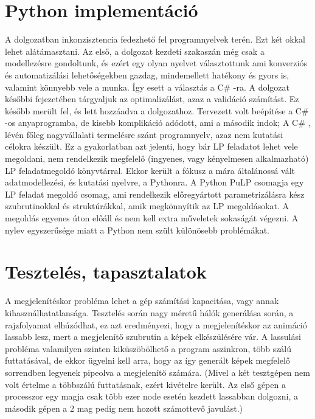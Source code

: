 \section{Python implementáció}
A dolgozatban inkonzisztencia fedezhető fel programnyelvek terén. Ezt két okkal lehet alátámasztani. Az első, a dolgozat kezdeti szakaszán még csak a modellezésre gondoltunk, és ezért egy olyan nyelvet választottunk ami konverziós és automatizálási lehetőségekben gazdag, mindemellett hatékony és gyors is, valamint könnyebb vele a munka. Így esett a választás a C\# -ra. A dolgozat későbbi fejezetében tárgyaljuk az optimalizálást, azaz a validáció számítást. Ez később merült fel, és lett hozzáadva a dolgozathoz. Tervezett volt beépítése a  C\# -os anyaprogramba, de kisebb komplikáció adódott, ami a második indok; A C\# , lévén főleg nagyvállalati termelésre szánt programnyelv, azaz nem kutatási célokra készült. Ez a gyakorlatban azt jelenti, hogy bár LP feladatot lehet vele megoldani, nem rendelkezik megfelelő (ingyenes, vagy kényelmesen alkalmazható) LP feladatmegoldó könyvtárral. Ekkor került a fókusz a mára általánossá vált adatmodellezési, és kutatási nyelvre, a Pythonra. A Python PuLP csomagja egy LP feladat megoldó csomag, ami rendelkezik előregyártott parametrizálásra kész szubrutinokkal és struktúrákkal, amik megkönnyítik az LP megoldásokat. A megoldás egyenes úton előáll és nem kell extra műveletek sokaságát végezni. A nylev egyszerűsége miatt a Python nem szült különösebb problémákat. 

\section{Tesztelés, tapasztalatok}
A megjelenítéskor probléma lehet a gép számítási kapacitása, vagy annak kihasználhatatlansága. Tesztelés során nagy méretű hálók generálása során, a rajzfolyamat elhúzódhat, ez azt eredményezi, hogy a megjelenítéskor az animáció lassabb lesz, mert a megjelenítő szubrutin a képek elkészülésére vár. A lassulási probléma valamilyen szinten kiküszöbölhető a program aszinkron, több szálú futtatásával, de ekkor ügyelni kell arra, hogy az így generált képek megfelelő sorrendben legyenek pipeolva a megjelenítő számára. (Mivel a két tesztgépen nem volt értelme a többszálú futtatásnak, ezért kivételre került. Az első gépen a processzor egy magja csak több ezer node esetén kezdett lassabban dolgozni, a második gépen a 2 mag pedig nem hozott számottevő javulást.)

